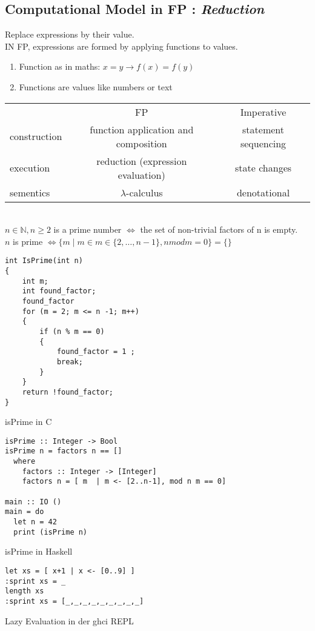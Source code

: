 \documentclass{article}
\begin{document}
\subsection{Computational Model in FP : \emph{Reduction}}
Replace expressions by their value.\\
IN FP, expressions are formed by applying functions to values.
\begin{enumerate}
\item Function as in maths: $x = y \rightarrow f(x) = f(y)$
\item Functions are values like numbers or text
\end{enumerate}
\begin{tabular}{l|c|c}
&FP&Imperative\\
construction & function application and composition & statement sequencing\\
execution & reduction (expression evaluation) & state changes\\
sementics & $\lambda$-calculus&denotational
\end{tabular}\bigskip\\
$ n \in \mathbb{N}, n \geq 2$ is a prime number $\Leftrightarrow$ the set of non-trivial factors of n is empty.\\
$n$ is prime $\Leftrightarrow \{ m \mid m \in m \in \{2,\ldots,n-1\}, n mod m = 0 \} = \{\}$\\
\begin{listing}[h!]
\begin{verbatim}
int IsPrime(int n)
{
    int m;
    int found_factor;
    found_factor
    for (m = 2; m <= n -1; m++)
    {
        if (n % m == 0)
        {
            found_factor = 1 ;
            break;
        }
    }
    return !found_factor;
}
\end{verbatim}
\caption{isPrime in C}
\end{listing}
\begin{listing}[h!]
\begin{verbatim}
isPrime :: Integer -> Bool
isPrime n = factors n == []
  where 
    factors :: Integer -> [Integer]
    factors n = [ m  | m <- [2..n-1], mod n m == 0]

main :: IO ()
main = do
  let n = 42
  print (isPrime n)
\end{verbatim}
\caption{isPrime in Haskell}
\end{listing}
\newpage
{}
\begin{listing}[h!]
\begin{verbatim}
let xs = [ x+1 | x <- [0..9] ]
:sprint xs = _
length xs
:sprint xs = [_,_,_,_,_,_,_,_,_]
\end{verbatim}
\caption{Lazy Evaluation in der ghci REPL}
\end{listing}
\end{document}
